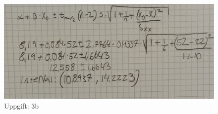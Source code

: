 \documentclass[a4paper]{article}
\begin{document}
\begin{figure} [h]
    \includegraphics[width=\linewidth]{3b.jpg}   
    \caption{Uppgift: 3b}
\end{figure}
\end{document}
